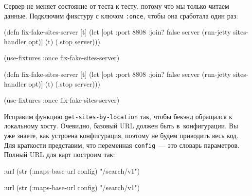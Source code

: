 Сервер не меняет состояние от теста к тесту, потому что мы только читаем
данные. Подключим фикстуру с ключом \verb|:once|, чтобы она сработала один
раз:

\ifx\DEVICETYPE\MOBILE

\begin{english}
  \begin{clojure}
(defn fix-fake-sites-server [t]
  (let [opt {:port 8808 :join? false}
        server (run-jetty
                 sites-handler opt)]
    (t)
    (.stop server)))

(use-fixtures :once
  fix-fake-sites-server)
  \end{clojure}
\end{english}

\else

\begin{english}
  \begin{clojure}
(defn fix-fake-sites-server [t]
  (let [opt {:port 8808 :join? false}
        server (run-jetty sites-handler opt)]
    (t)
    (.stop server)))

(use-fixtures :once fix-fake-sites-server)
  \end{clojure}
\end{english}

\fi


\mnoindent
Исправим функцию \verb|get-sites-by-location| так, чтобы бекэнд обращался к
локальному хосту. Очевидно, базовый URL должен быть в~конфигурации. Вы уже
знаете, как устроена конфигурация, поэтому не будем приводить весь код. Для
краткости представим, что переменная \verb|config|~--- это словарь
параметров. Полный URL для карт построим так:

\ifx\DEVICETYPE\MOBILE

\begin{english}
  \begin{clojure}
{:url (str (:maps-base-url config)
        "/search/v1")}
  \end{clojure}
\end{english}

\else

\begin{english}
  \begin{clojure}
{:url (str (:maps-base-url config) "/search/v1")}
  \end{clojure}
\end{english}

\fi

